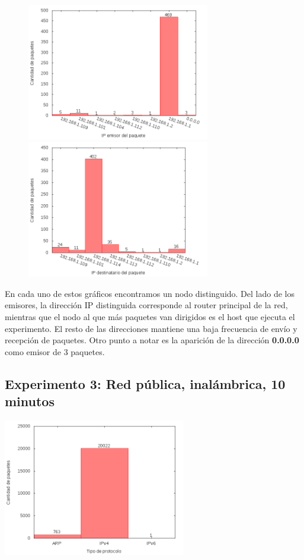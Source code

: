 \begin{figure}[!h]
\centering
\begin{minipage}{8cm}
  \centering
  \includegraphics[width=8cm]{../mediciones/home-wfi-10/home-wfi-10IpsSrcArp.png}
\end{minipage}%
\begin{minipage}{8cm}
  \centering
  \includegraphics[width=8cm]{../mediciones/home-wfi-10/home-wfi-10IpsDstArp.png}
\end{minipage}
\end{figure}

En cada uno de estos gráficos encontramos un nodo distinguido. Del lado de los emisores, la dirección IP distinguida corresponde al
router principal de la red, mientras que el nodo al que más paquetes van dirigidos es el host que ejecuta el experimento. El resto
de las direcciones mantiene una baja frecuencia de envío y recepción de paquetes. Otro punto a notar es la aparición de la dirección
\textbf{0.0.0.0} como emisor de 3 paquetes.

\subsection{Experimento 3: Red pública, inalámbrica, 10 minutos}

\begin{center}
\includegraphics[width=8cm]{../mediciones/altop-wifi-10/altop10Protocolos.png}
\end{center}

